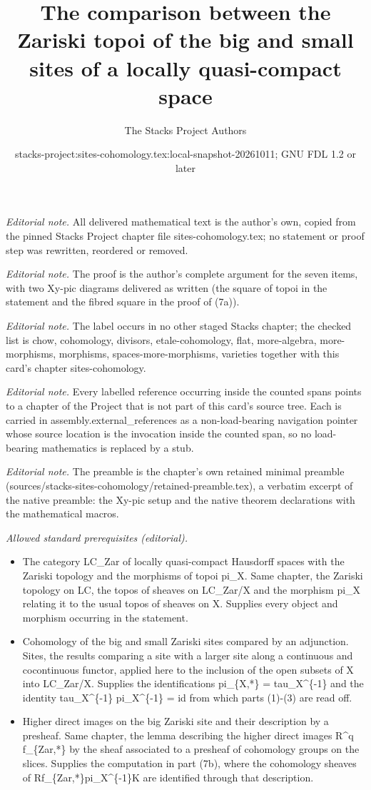 \documentclass[10pt,a4paper]{amsart}
\title{The comparison between the Zariski topoi of the big and small sites of a locally quasi-compact space}
\author{The Stacks Project Authors}
\date{stacks-project:sites-cohomology.tex:local-snapshot-20261011; GNU FDL 1.2 or later}
\theoremstyle{plain}
\theoremstyle{definition}
\theoremstyle{remark}
\numberwithin{equation}{subsection}
\begin{document}
\maketitle
\noindent\textit{Editorial note.} All delivered mathematical text is the author's own, copied from the pinned Stacks Project chapter file sites-cohomology.tex; no statement or proof step was rewritten, reordered or removed.\par\medskip
\noindent\textit{Editorial note.} The proof is the author's complete argument for the seven items, with two Xy-pic diagrams delivered as written (the square of topoi in the statement and the fibred square in the proof of (7a)).\par\medskip
\noindent\textit{Editorial note.} The label occurs in no other staged Stacks chapter; the checked list is chow, cohomology, divisors, etale-cohomology, flat, more-algebra, more-morphisms, morphisms, spaces-more-morphisms, varieties together with this card's chapter sites-cohomology.\par\medskip
\noindent\textit{Editorial note.} Every labelled reference occurring inside the counted spans points to a chapter of the Project that is not part of this card's source tree. Each is carried in assembly.external\_references as a non-load-bearing navigation pointer whose source location is the invocation inside the counted span, so no load-bearing mathematics is replaced by a stub.\par\medskip
\noindent\textit{Editorial note.} The preamble is the chapter's own retained minimal preamble (sources/stacks-sites-cohomology/retained-preamble.tex), a verbatim excerpt of the native preamble: the Xy-pic setup and the native theorem declarations with the mathematical macros.\par\medskip
\noindent\textit{Allowed standard prerequisites (editorial).}\begin{itemize}
\item The category LC\_Zar of locally quasi-compact Hausdorff spaces with the Zariski topology and the morphisms of topoi pi\_X. Same chapter, the Zariski topology on LC, the topos of sheaves on LC\_Zar/X and the morphism pi\_X relating it to the usual topos of sheaves on X. Supplies every object and morphism occurring in the statement.
\item Cohomology of the big and small Zariski sites compared by an adjunction. Sites, the results comparing a site with a larger site along a continuous and cocontinuous functor, applied here to the inclusion of the open subsets of X into LC\_Zar/X. Supplies the identifications pi\_\{X,*\} = tau\_X\textasciicircum{}\{-1\} and the identity tau\_X\textasciicircum{}\{-1\} pi\_X\textasciicircum{}\{-1\} = id from which parts (1)-(3) are read off.
\item Higher direct images on the big Zariski site and their description by a presheaf. Same chapter, the lemma describing the higher direct images R\textasciicircum{}q f\_\{Zar,*\} by the sheaf associated to a presheaf of cohomology groups on the slices. Supplies the computation in part (7b), where the cohomology sheaves of Rf\_\{Zar,*\}pi\_X\textasciicircum{}\{-1\}K are identified through that description.
\end{itemize}\medskip
\end{document}
